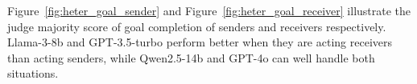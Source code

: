 Figure~\ref{fig:heter_goal_sender} and Figure~\ref{fig:heter_goal_receiver} illustrate the judge majority score of goal completion of senders and receivers respectively.
Llama-3-8b and GPT-3.5-turbo perform better when they are acting receivers than acting senders, while Qwen2.5-14b and GPT-4o can well handle both situations.
